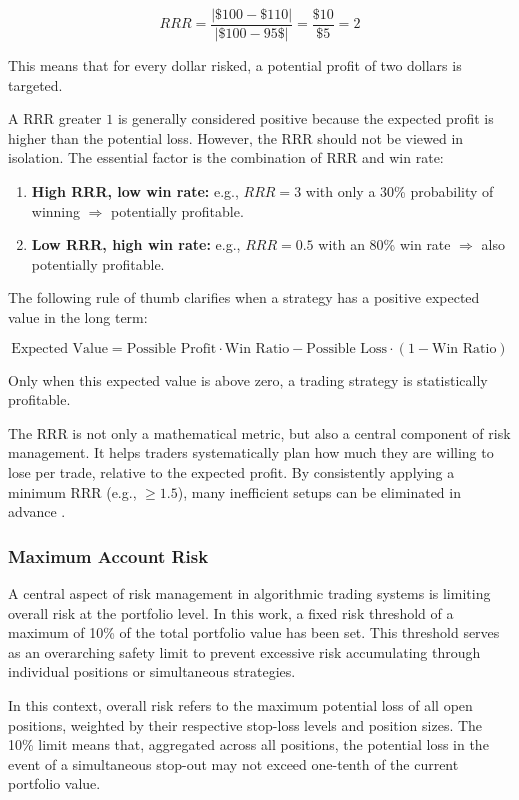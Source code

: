 \[
    RRR = \frac{|\$100 - \$110|}{|\$100 - 95\$|} = \frac{\$10}{\$5} = 2
\]

\noindent
This means that for every dollar risked, a potential profit of two dollars is targeted.

A RRR greater $1$ is generally considered positive because the expected profit is higher than the potential loss.
However, the RRR should not be viewed in isolation.
The essential factor is the combination of RRR and win rate:

\begin{enumerate}
    \item \textbf{High RRR, low win rate:} e.g., $RRR=3$ with only a 30\% probability of winning $\Rightarrow$ potentially profitable.
    \item \textbf{Low RRR, high win rate:} e.g., $RRR=0.5$ with an 80\% win rate $\Rightarrow$ also potentially profitable.
\end{enumerate}

\noindent
The following rule of thumb clarifies when a strategy has a positive expected value in the long term:

\[
    \text{Expected Value} = \text{Possible Profit} \cdot \text{Win Ratio} - \text{Possible Loss} \cdot (1 - \text{Win Ratio})
\]

\noindent
Only when this expected value is above zero, a trading strategy is statistically profitable.

The RRR is not only a mathematical metric, but also a central component of risk management.
It helps traders systematically plan how much they are willing to lose per trade, relative to the expected profit.
By consistently applying a minimum RRR (e.g., $\ge 1.5$), many inefficient setups can be eliminated in advance \cite{bitpanda-crv}.

\subsubsection{Maximum Account Risk}

A central aspect of risk management in algorithmic trading systems is limiting overall risk at the portfolio level.
In this work, a fixed risk threshold of a maximum of 10\% of the total portfolio value has been set.
This threshold serves as an overarching safety limit to prevent excessive risk accumulating through individual positions or simultaneous strategies.

In this context, overall risk refers to the maximum potential loss of all open positions, weighted by their respective stop-loss levels and position sizes.
The 10\% limit means that, aggregated across all positions, the potential loss in the event of a simultaneous stop-out may not exceed one-tenth of the current portfolio value.

